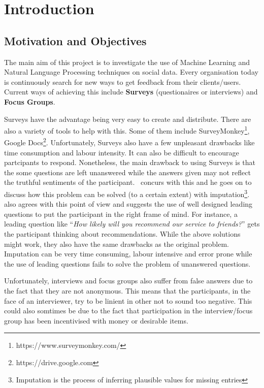 
\chapter{Introduction}


\section{Motivation and Objectives}
The main aim of this project is to investigate the use of Machine Learning and Natural Language
Processing techniques on social data. Every organisation today is continuously search for new ways
to get feedback from their clients/users. Current ways of achieving this include
\textbf{Surveys} (questionaires or interviews) and \textbf{Focus Groups}.

Surveys have the advantage being very easy to create and distribute. There are also a variety of
tools to help with this. Some of them include SurveyMonkey\footnote{https://www.surveymonkey.com/},
Google Docs\footnote{https://drive.google.com}. Unfortunately, Surveys also have a few unpleasant
drawbacks like time consumption and labour intensity. It can also be difficult to encourage
partcipants to respond. Nonetheless, the main drawback to using Surveys is that the some questions
are left unanswered while the answers given may not reflect the truthful sentiments of the
participant.~\cite{DonaldBRubin1987} concurs with this and he goes on to discuss how this problem
can be solved (to a certain extent) with imputation\footnote{Imputation is the process of inferring
plausible values for missing entries}.~\cite{BobEHayes2008} also agrees with this point of view and
suggests the use of well designed leading questions to put the participant in the right frame of
mind. For instance, a leading question like ``\textit{How likely will you recommend our service to
friends?}'' gets the participant thinking about recommendations. While the above solutions might
work, they also have the same drawbacks as the original problem. Imputation can be very time
consuming, labour intensive and error prone while the use of leading questions fails to solve the
problem of unanswered questions.

Unfortunately, interviews and focus groups also suffer from false answers due to the fact that they
are not anonymous. This means that the participants, in the face of an interviewer, try to be
linient in other not to sound too negative. This could also somtimes be due to the fact that
participation in the interview/focus group has been incentivised with money or desirable items.

